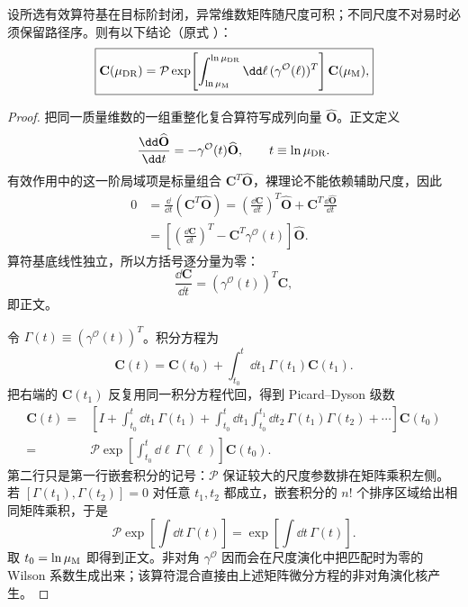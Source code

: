 \begin{proposition}
设所选有效算符基在目标阶封闭，异常维数矩阵随尺度可积；不同尺度不对易时必须保留路径序。则有以下结论（原式 ）：
\begin{equation*}
\boxed{
\mathbf C(\mu_{\rm DR})
=\mathcal P\exp\!\left[
\int_{\ln\mu_{\rm M}}^{\ln\mu_{\rm DR}}\dd\ell\,
(\gamma^{\mathcal O}(\ell))^T
\right]\mathbf C(\mu_{\rm M}),}
\end{equation*}
\end{proposition}
\begin{proof}
把同一质量维数的一组重整化复合算符写成列向量 $\widehat{\mathbf O}$。正文定义
\begin{equation*}
\frac{\dd\widehat{\mathbf O}}{\dd t}
=-\gamma^{\mathcal O}(t)\widehat{\mathbf O},
\qquad t\equiv\ln\mu_{\rm DR}.
\end{equation*}
有效作用中的这一阶局域项是标量组合 $\mathbf C^T\widehat{\mathbf O}$，裸理论不能依赖辅助尺度，因此
\begin{align*}
0
&=\frac{\dd}{\dd t}(\mathbf C^T\widehat{\mathbf O})
=\left(\frac{\dd\mathbf C}{\dd t}\right)^T\widehat{\mathbf O}
+\mathbf C^T\frac{\dd\widehat{\mathbf O}}{\dd t}\\
&=\left[
\left(\frac{\dd\mathbf C}{\dd t}\right)^T
-\mathbf C^T\gamma^{\mathcal O}(t)
\right]\widehat{\mathbf O}.
\end{align*}
算符基底线性独立，所以方括号逐分量为零：
\begin{equation*}
\frac{\dd\mathbf C}{\dd t}
=(\gamma^{\mathcal O}(t))^T\mathbf C,
\end{equation*}
即正文。

令 $\Gamma(t)\equiv(\gamma^{\mathcal O}(t))^T$。积分方程为
\begin{equation*}
\mathbf C(t)=\mathbf C(t_0)+\int_{t_0}^{t}\dd t_1\,\Gamma(t_1)\mathbf C(t_1).
\end{equation*}
把右端的 $\mathbf C(t_1)$ 反复用同一积分方程代回，得到 Picard--Dyson 级数
\begin{align*}
\mathbf C(t)
={}&\left[I+\int_{t_0}^{t}\dd t_1\,\Gamma(t_1)
+\int_{t_0}^{t}\dd t_1\int_{t_0}^{t_1}\dd t_2\,
\Gamma(t_1)\Gamma(t_2)+\cdots\right]\mathbf C(t_0)\\
={}&\mathcal P\exp\!\left[
\int_{t_0}^{t}\dd\ell\,\Gamma(\ell)
\right]\mathbf C(t_0).
\end{align*}
第二行只是第一行嵌套积分的记号：$\mathcal P$ 保证较大的尺度参数排在矩阵乘积左侧。若 $[\Gamma(t_1),\Gamma(t_2)]=0$ 对任意 $t_1,t_2$ 都成立，嵌套积分的 $n!$ 个排序区域给出相同矩阵乘积，于是
\begin{equation*}
\mathcal P\exp\!\left[\int\dd t\,\Gamma(t)\right]
=\exp\!\left[\int\dd t\,\Gamma(t)\right].
\end{equation*}
取 $t_0=\ln\mu_{\rm M}$ 即得到正文。非对角 $\gamma^{\mathcal O}$ 因而会在尺度演化中把匹配时为零的 Wilson 系数生成出来；该算符混合直接由上述矩阵微分方程的非对角演化核产生。
\end{proof}

